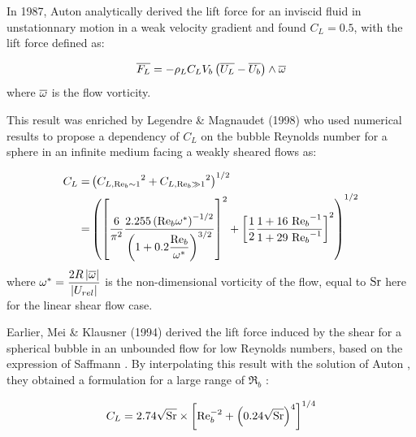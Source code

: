 In 1987, Auton \etal \cite{auton_lift_1987} analytically derived the lift force for an inviscid fluid in unstationnary motion in a weak velocity gradient and found $C_{L}=0.5$, with the lift force defined as:

\begin{equation}
\overline{F_{L}} = - \rho_{L} C_{L} V_{b} \left( \overline{U_{L}} - \overline{U_{b}} \right) \wedge \overline{\omega} 
\end{equation} 
where $\overline{\omega}$ is the flow vorticity.

\npar
This result was enriched by Legendre \& Magnaudet (1998) \cite{legendre_lift_1998} who used numerical results to propose a dependency of $C_{L}$ on the bubble Reynolds number for a sphere in an infinite medium facing a weakly sheared flows as:

\begin{align}
C_{L} =&\left(  {C_{L,\mathrm{Re}_{b} \sim 1}}^{2} + {C_{L,\mathrm{Re}_{b} \gg 1}}^{2}  \right)^{1/2}\\
 =&\left(  \left[ \frac{6}{\pi^{2}} \frac{2.255 \left( \mathrm{Re}_{b}\omega^{*} \right)^{-1/2}}{ \left( 1+0.2\dfrac{\mathrm{Re}_{b}}{\omega^{*}} \right)^{3/2} } \right]^{2} + \left[  \frac{1}{2} \frac{1+16\ {\mathrm{Re}_{b}}^{-1}}{1+29\ {\mathrm{Re}_{b}}^{-1}}  \right]^{2}  \right)^{1/2}
\end{align} 
where $\omega^{*} = \dfrac{2R\left| \overline{\omega} \right|}{\left| U_{rel} \right|}$ is the non-dimensional vorticity of the flow, equal to $\mathrm{Sr}$ here for the linear shear flow case.
%


\npar

Earlier, Mei \& Klausner (1994) \cite{mei_shear_1994} derived the lift force induced by the shear for a spherical bubble in an unbounded flow for low Reynolds numbers, based on the expression of Saffmann \cite{saffman_lift_1965}. By interpolating this result with the solution of Auton \cite{auton_lift_1987}, they obtained a formulation for a large range of $\Re_{b}$ :

\begin{equation}
C_{L} = 2.74 \sqrt{\mathrm{Sr}} \times \left[ \mathrm{Re}_{b}^{-2} + \left( 0.24\sqrt{\mathrm{Sr}} \right)^{4} \right]^{1/4}
\label{eq:lift_mei}
\end{equation}


